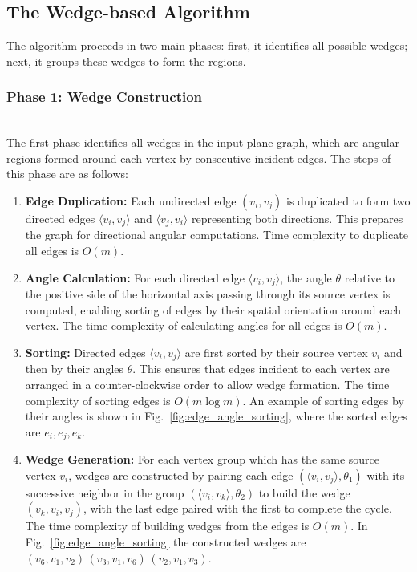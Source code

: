 \documentclass[conference]{IEEEtran}
\begin{document}
\subsection{The Wedge-based Algorithm}
The algorithm proceeds in two main phases: first, it identifies all possible wedges; next, it groups these wedges to form the regions.
\subsubsection{Phase 1: Wedge Construction}\hfill\\
The first phase identifies all wedges in the input plane graph, which are angular regions formed around each vertex by consecutive incident edges. The steps of this phase are as follows:

\begin{enumerate}
    \item \textbf{Edge Duplication:} Each undirected edge \( (v_i, v_j) \) is duplicated to form two directed edges \( \langle v_i, v_j\rangle \) and \( \langle v_j, v_i\rangle \) representing both directions. This prepares the graph for directional angular computations. Time complexity to duplicate all edges is \( O(m) \).
    \item \textbf{Angle Calculation:} For each directed edge \( \langle v_i, v_j\rangle \), the angle \( \theta\) relative to the positive side of the horizontal axis passing through its source vertex is computed, enabling sorting of edges by their spatial orientation around each vertex. The time complexity of calculating angles for all edges is \( O(m) \).
    \item \textbf{Sorting:} Directed edges \( \langle v_i, v_j\rangle \) are first sorted by their source vertex \( v_i\) and then by their angles \( \theta \). This ensures that edges incident to each vertex are arranged in a counter-clockwise order to allow wedge formation. The time complexity of sorting edges is \( O(m \log m) \). An example of sorting edges by their angles is shown in Fig.~\ref{fig:edge_angle_sorting}, where the sorted edges are \(e_i, e_j, e_k\).
    \item \textbf{Wedge Generation:} For each vertex group which has the same source vertex \( v_i \), wedges are constructed by pairing each edge \((\langle v_i, v_j \rangle, \theta_1)\) with its successive neighbor in the group \((\langle v_i, v_k \rangle, \theta_2)\) to build the wedge \( (v_k, v_i, v_j) \), with the last edge paired with the first to complete the cycle. The time complexity of building wedges from the edges is \( O(m) \). In Fig.~\ref{fig:edge_angle_sorting} the constructed wedges are \((v_6, v_1, v_2)\, (v_3, v_1, v_6)\, (v_2, v_1, v_3)\).
\end{enumerate}
\end{document}
